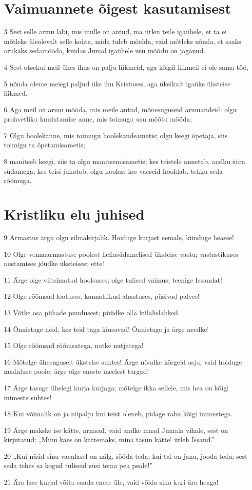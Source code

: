 \section*{Vaimuannete õigest kasutamisest}

\par 3 Sest selle armu läbi, mis mulle on antud, ma ütlen teile igaühele, et ta ei mõtleks üleolevalt selle kohta, mida tuleb mõelda, vaid mõtleks nõnda, et saaks arukaks sedamööda, kuidas Jumal igaühele usu mõõdu on jaganud.
\par 4 Sest otsekui meil ühes ihus on palju liikmeid, aga kõigil liikmeil ei ole sama töö,
\par 5 nõnda oleme meiegi paljud üks ihu Kristuses, aga üksikult igaüks üksteise liikmed.
\par 6 Aga meil on armu mööda, mis meile antud, mõnesuguseid armuandeid: olgu prohvetliku kuulutamise anne, mis toimugu usu mõõtu mööda;
\par 7 Olgu hoolekanne, mis toimugu hoolekandeametis; olgu keegi õpetaja, siis toimigu ta õpetamisametis;
\par 8 manitseb keegi, siis ta olgu manitsemisametis; kes teistele annetab, andku siira südamega; kes teisi juhatab, olgu hoolas; kes vaeseid hooldab, tehku seda rõõmuga.

\section*{Kristliku elu juhised}

\par 9 Armastus ärgu olgu silmakirjalik. Hoiduge kurjast eemale, kiinduge heasse!
\par 10 Olge vennaarmastuse poolest hellasüdamelised üksteise vastu; vastastikuses austamises jõudke üksteisest ette!
\par 11 Ärge olge viitsimatud hoolsuses; olge tulised vaimus; teenige Issandat!
\par 12 Olge rõõmsad lootuses, kannatlikud ahastuses, püsivad palves!
\par 13 Võtke osa pühade puudusest; püüdke olla külalislahked.
\par 14 Õnnistage neid, kes teid taga kiusavad! Õnnistage ja ärge needke!
\par 15 Olge rõõmsad rõõmsatega, nutke nutjatega!
\par 16 Mõtelge ühesuguselt üksteise suhtes! Ärge nõudke kõrgeid asju, vaid hoiduge madaluse poole; ärge olge eneste meelest targad!
\par 17 Ärge tasuge ühelegi kurja kurjaga; mõtelge ikka sellele, mis hea on kõigi inimeste suhtes!
\par 18 Kui võimalik on ja niipalju kui teist oleneb, pidage rahu kõigi inimestega.
\par 19 Ärge makske ise kätte, armsad, vaid andke maad Jumala vihale, sest on kirjutatud: „Minu käes on kättemaks, mina tasun kätte! ütleb Issand.”
\par 20 „Kui nüüd sinu vaenlasel on nälg, sööda teda; kui tal on janu, jooda teda; sest seda tehes sa kogud tuliseid süsi tema pea peale!”
\par 21 Ära lase kurjal võitu saada enese üle, vaid võida sina kuri ära heaga!


